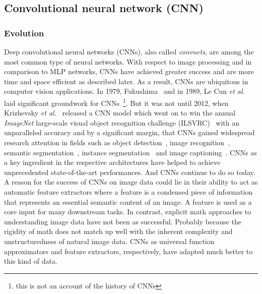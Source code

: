 \documentclass[12pt,a4paper]{article}
\begin{document}
\subsection{Convolutional neural network (CNN)}
\subsubsection{Evolution}
Deep convolutional neural networks (CNNs), also called \textit{convnets}, are among the most common type of neural networks. With respect to image processing and in comparison to MLP networks, CNNs have achieved greater success and are more time and space efficient as described later. As a result, CNNs are ubiquitous in computer vision applications. In 1979, Fukushima~\cite{FukushimaCnn79} and in 1989, Le Cun \textit{et al.}~\cite{CunGrounworkCNNs} laid significant groundwork for CNNs~\footnote{this is not an account of the history of CNNs}. But it was not until 2012, when Krizhevsky \textit{et al.}~\cite{AlexNet} released a CNN model which went on to win the annual \textit{ImageNet} large-scale visual object recognition challenge (ILSVRC)~\cite{Imagenet} with an unparalleled accuracy and by a significant margin, that CNNs gained widespread research attention in fields such as object detection~\cite{FasterRCNN}, image recognition~\cite{AlexNet,DenseNet}, semantic segmentation~\cite{DeepLabv3+}, instance segmentation~\cite{MaskScoringRCNN} and image captioning~\cite{ImageCaptioningSOTA}. CNNs as a key ingredient in the respective architectures have helped to achieve unprecedented state-of-the-art performances. And CNNs continue to do so today. A reason for the success of CNNs on image data could lie in their ability to act as automatic feature extractors where a feature is a condensed piece of information that represents an essential semantic content of an image. A feature is used as a core input for many downstream tasks. In contrast, explicit math approaches to understanding image data have not been as successful. Probably because the rigidity of math does not match up well with the inherent complexity and unstructuredness of natural image data. CNNs as universal function approximators and feature extractors, respectively, have adapted much better to this kind of data.
\end{document}
